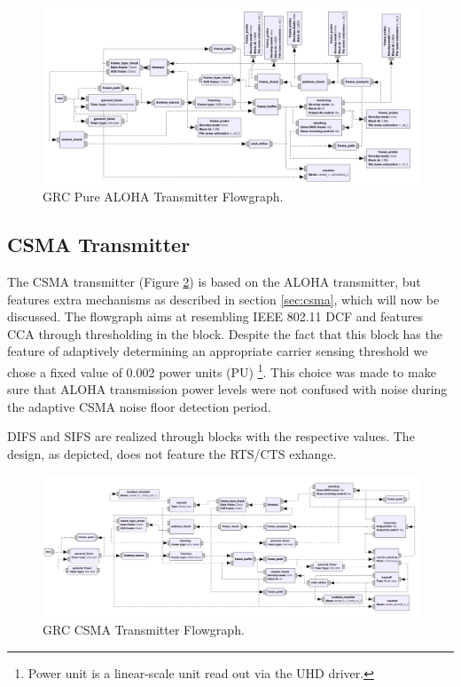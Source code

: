 \begin{figure}
	\label{fig:grc-aloha-sender}
	\begin{center}
		\includegraphics[width=\textwidth]{pictures/grc_aloha_transmitter_flowgraph}
\end{center}
\caption{GRC Pure ALOHA Transmitter Flowgraph.}
\end{figure}

\subsection{CSMA Transmitter}
\label{sec:csma-transmiter}

The CSMA transmitter (Figure \ref{fig:grc-csma-sender}) is based on the ALOHA transmitter, but features extra mechanisms as described in section \ref{sec:csma}, which will now be discussed. The flowgraph aims at resembling IEEE 802.11 DCF and features CCA through thresholding in the  block. Despite the fact that this block has the feature of adaptively determining an appropriate carrier sensing threshold we chose a fixed value of 0.002 power units (PU) \footnote{Power unit is a linear-scale unit read out via the UHD driver.}. This choice was made to make sure that ALOHA transmission power levels were not confused with noise during the adaptive CSMA noise floor detection period. 

DIFS and SIFS are realized through  blocks with the respective values. The design, as depicted, does not feature the RTS/CTS exhange.

\begin{figure}
	\label{fig:grc-csma-sender}
	\begin{center}
		\includegraphics[width=\textwidth]{pictures/grc_csma_transmitter_flowgraph}
\end{center}
\caption{GRC CSMA Transmitter Flowgraph.}
\end{figure}

